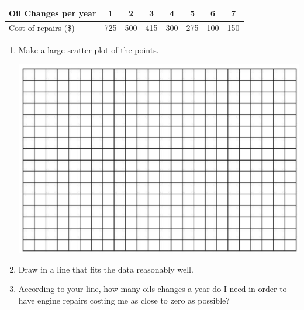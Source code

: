 \documentclass[12pt]{article}
\begin{document}
\begin{enumerate}
\begin{center}
\begin{tabular} {|l|c|c |c|c|c|c|c|}  \hline
Oil Changes per year & 1 & 2 & 3 & 4 & 5 & 6 & 7  \\ \hline
Cost of repairs (\$) & 725 & 500 & 415 & 300 & 275 & 100 & 150  \\ \hline
\end{tabular}
\end{center}

\begin{enumerate}
\item Make a large scatter plot of the points. 

\vspace{.1in}
\begin{center}
 {\includegraphics [width = 6in] {../graphPaper}}
\end{center}
\vspace{.1in}

\item Draw in a line that fits the data reasonably well.
\item  According to your line, how many oils changes a year do I need in order to have engine repairs costing me as close to zero as possible?
\end{enumerate}




\end{enumerate}
\end{document}
